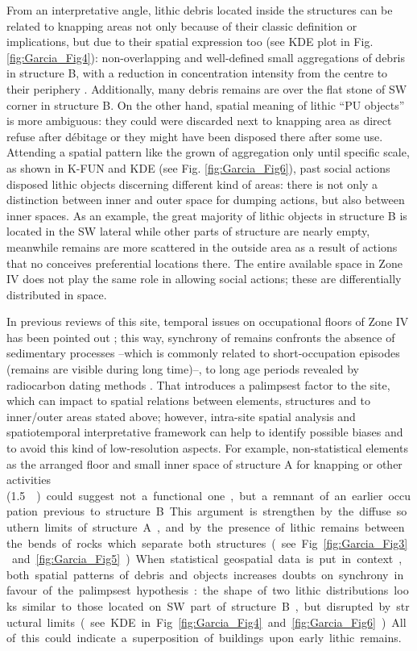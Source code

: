 From an interpretative angle, lithic debris located inside the structures can be related to knapping areas not only because of their classic definition or implications, but due to their spatial expression too (see KDE plot in Fig. \ref{fig:Garcia_Fig4}): non-overlapping and well-defined small aggregations of debris in structure B, with a reduction in concentration intensity from the centre to their periphery \parencites[e.g.][]{Kvamme_1997}{Nadel_2001}{Newcomer_1980}. Additionally, many debris remains are over the flat stone of SW corner in structure B. On the  other hand, spatial meaning of lithic “PU objects” is more ambiguous: they could were discarded next to knapping area as direct refuse after débitage or they might have been disposed there after some use. Attending a spatial pattern like the grown of aggregation only until specific scale, as shown in K-FUN and KDE (see Fig. \ref{fig:Garcia_Fig6}), past social actions disposed lithic objects discerning different kind of areas: there is not only a distinction between inner and outer space for dumping actions, but also between inner spaces. As an example, the great majority of lithic objects in structure B is located in the SW lateral while other parts of structure are nearly empty, meanwhile remains are more scattered in the outside area as a result of actions that no conceives preferential locations there. 
The entire available space in Zone IV does not play the same role in allowing social actions; these are differentially distributed in space.

In previous reviews of this site, temporal issues on occupational floors of Zone IV has been pointed out \parencite[see][]{Arias_2011}; this way, synchrony of remains confronts the absence of sedimentary processes –which is commonly related to short-occupation episodes (remains are visible during long time)–, to long age periods revealed by radiocarbon dating methods \parencite[35--39]{Arias_2011}. That introduces a palimpsest factor to the site, which can impact to spatial relations between elements, structures and to inner/outer areas stated above; however, intra-site spatial analysis and spatiotemporal interpretative framework can help to identify possible biases and to avoid this kind of low-resolution aspects. For example, non-statistical elements as the arranged floor and small inner space of structure A for knapping or other activities (\SI{1.5}{\metre\square}) could suggest not a functional one, but a remnant of an earlier occupation previous to structure B. This argument is strengthen by the diffuse southern limits of structure A, and by the presence of lithic remains between the bends of rocks which separate both structures (see Fig. \ref{fig:Garcia_Fig3} and \ref{fig:Garcia_Fig5}). When statistical geospatial data is put in context, both spatial patterns of debris and objects increases doubts on synchrony in favour of the palimpsest hypothesis: the shape of two lithic distributions looks similar to those located on SW part of structure B, but disrupted by structural limits (see KDE in Fig. \ref{fig:Garcia_Fig4} and \ref{fig:Garcia_Fig6}). All of this could indicate a superposition of buildings upon early lithic remains. 

